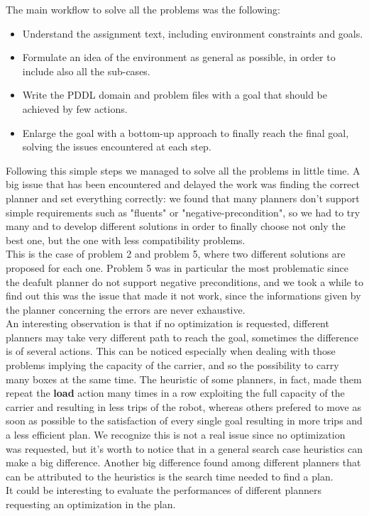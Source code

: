 The main workflow to solve all the problems was the following: 
\begin{itemize}
    \item Understand the assignment text, including environment constraints and goals.
    \item Formulate an idea of the environment as general as possible, in order to include also all the sub-cases.
    \item Write the PDDL domain and problem files with a goal that should be achieved by few actions.
    \item Enlarge the goal with a bottom-up approach to finally reach the final goal, solving the issues encountered at each step. 
\end{itemize}
Following this simple steps we managed to solve all the problems in little time.
A big issue that has been encountered and delayed the work was finding the correct planner and set everything correctly: 
we found that many planners don't support simple requirements such as "fluents" or "negative-precondition", so we had to try many and to develop different
solutions in order to finally choose not only the best one, but the one with less compatibility problems.\\
This is the case of problem 2 and problem 5, where two different solutions are proposed for each one.
Problem 5 was in particular the most problematic since the deafult planner do not support negative preconditions, and we took a while to find out this was the issue that made it not work,
since the informations given by the planner concerning the errors are never exhaustive.\\
An interesting observation is that if no optimization is requested, different planners may take very different path to reach the goal, sometimes the difference is of several actions.
This can be noticed especially when dealing with those problems implying the capacity of the carrier, and so the possibility to carry many boxes at the same time.
The heuristic of some planners, in fact, made them repeat the \textbf{load} action many times in a row exploiting the full capacity of the carrier and resulting in less trips of the robot,
whereas others prefered to move as soon as possible to the satisfaction of every single goal resulting in more trips and a less efficient plan.
We recognize this is not a real issue since no optimization was requested, but it's worth to notice that in a general search case heuristics can make a big difference.
Another big difference found among different planners that can be attributed to the heuristics is the search time needed to find a plan.\\
It could be interesting to evaluate the performances of different planners requesting an optimization in the plan.

